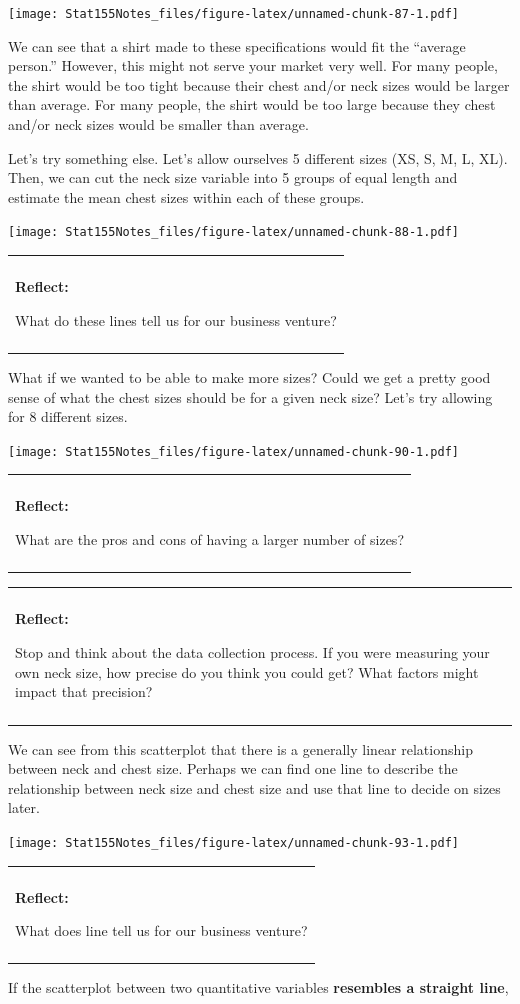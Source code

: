 \documentclass[]{book}
\newenvironment{reflect}
{
    \begin{center}
    
    \begin{tabular}{|p{0.8\textwidth}|}
    \rowcolor{LightBlue}
    \hline\\
    \rowcolor{LightBlue}
    \textbf{Reflect:}
}
{
    \\\rowcolor{LightBlue}
    \\\hline
    \end{tabular} 
    \end{center}
}
\begin{document}
\texttt{[image: Stat155Notes\_files/figure-latex/unnamed-chunk-87-1.pdf]}

We can see that a shirt made to these specifications would fit the ``average person.'' However, this might not serve your market very well. For many people, the shirt would be too tight because their chest and/or neck sizes would be larger than average. For many people, the shirt would be too large because they chest and/or neck sizes would be smaller than average.

Let's try something else. Let's allow ourselves 5 different sizes (XS, S, M, L, XL). Then, we can cut the neck size variable into 5 groups of equal length and estimate the mean chest sizes within each of these groups.

\texttt{[image: Stat155Notes\_files/figure-latex/unnamed-chunk-88-1.pdf]}

\begin{reflect}
What do these lines tell us for our business venture?
\end{reflect}

What if we wanted to be able to make more sizes? Could we get a pretty good sense of what the chest sizes should be for a given neck size? Let's try allowing for 8 different sizes.

\texttt{[image: Stat155Notes\_files/figure-latex/unnamed-chunk-90-1.pdf]}

\begin{reflect}
What are the pros and cons of having a larger number of sizes?
\end{reflect}

\begin{reflect}
Stop and think about the data collection process. If you were measuring
your own neck size, how precise do you think you could get? What factors
might impact that precision?
\end{reflect}

We can see from this scatterplot that there is a generally linear relationship between neck and chest size. Perhaps we can find one line to describe the relationship between neck size and chest size and use that line to decide on sizes later.

\texttt{[image: Stat155Notes\_files/figure-latex/unnamed-chunk-93-1.pdf]}

\begin{reflect}
What does line tell us for our business venture?
\end{reflect}

If the scatterplot between two quantitative variables \textbf{resembles a straight line},
\end{document}
